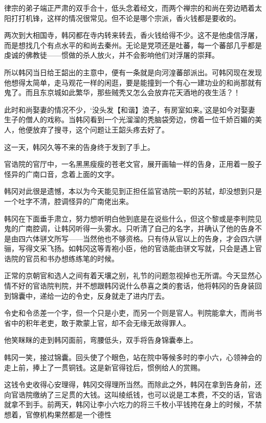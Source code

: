 律宗的弟子端正严肃的双手合十，低头念着经文，而两个禅宗的和尚在旁边晒着太阳打打机锋，这样的情况很常见。但不论是哪个宗派，香火钱都是要收的。

两次到大相国寺，韩冈都在寺内转来转去，香火钱给得不少。这不是他虔信浮屠，而是想找几个有点水平的和尚去秦州。无论是党项还是吐蕃，每一个蕃部几乎都是虔诚的佛教徒——惯做的杀人放火，并不会影响他们对浮屠的崇拜。

所以韩冈当日给王韶出的主意中，便有一条就是向河湟蕃部派出。可韩冈现在发现他想得太简单，走马观花一样的闲逛，要是能撞到一个有心一建功业的和尚那就有鬼了。而且东京城如此繁华，那些贼秃又怎么会放弃花天酒地的夜生活？！

此时和尚娶妻的情况不少，‘没头发【和谐】浪子，有房室如来。’这是如今对娶妻生子的僧人的戏称。当韩冈看到一个光溜溜的秃脑袋旁边，傍着一位千娇百媚的美人，他便放弃了搜寻，这个问题让王韶头疼去好了。

这一天，韩冈久等不来的告身终于发到了手上。

官诰院的官厅中，一名黑黑瘦瘦的苍老文官，展开画轴一样的告身，正用着一股子怪异的广南口音，念着上面的文字。

韩冈对此很是遗憾，本以为今天能见到正担任监官诰院一职的苏轼，却没想到只是一个吐字不清，腔调怪异的广南佬出来。

韩冈在下面垂手肃立，努力想听明白他到底是在说些什么，但这个黎或是李判院见鬼的广南腔调，让韩冈听得一头雾水。只听清了自己的名字，并确认了他的告身不是由四六体骈文所写——当然他也不够资格。只有侍从官以上的告身，才会四六骈骊，写得文采飞扬。如韩冈这等青袍小臣，他的官诰能由骈文写就，只会是遇上官诰院的官员和书办想练练笔的时候。

正常的京朝官和选人之间有着天壤之别，礼节的问题忽视掉也无所谓。今天显然心情不好的官诰院判院，并不想跟韩冈说什么恭喜之类的套话，他将韩冈的告身装回到锦囊中，递给一边的令史，反身就走了进内厅去。

令史和令丞差一个字，但一个只是小吏，而另一个则是官人。判院能拿大，而尚书省中的积年老吏，敢于欺蒙上官，却不会无缘无故得罪人。

他笑眯眯的走到韩冈面前，弯腰低头，双手将告身锦囊奉上。

韩冈一笑，接过锦囊。回头使了个眼色，站在院中等候多时的李小六，心领神会的走上前，捧上了一贯铜钱。这是新官得铨后，惯例给人的赏赐。

这钱令史收得心安理得，韩冈交得理所当然。而除此之外，韩冈在拿到告身前，还向官诰院缴纳了三足贯的大钱。这叫绫纸钱，也可以说是工本费，不交的话，官诰就拿不到手。前两天，韩冈让李小六吃力的将三千枚小平钱挎在身上的时候，不禁想着，官僚机构果然都是一个德性

